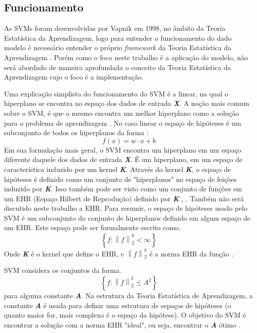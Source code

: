  \subsection{Funcionamento}

As SVMs foram desenvolvidas por Vapnik em 1998, no âmbito da Teoria Estatística da Aprendizagem, logo para entender o funcionamento do dado modelo é necessário entender o próprio \textit{framework} da Teoria Estatística da Aprendizagem \cite{vapnik1998statistical}. Porém como o foco neste trabalho é a aplicação do modelo, não será abordado de maneira aprofundada o conceito da Teoria Estatística da Aprendizagem cujo o foco é a implementação.
 
Uma explicação simplista do funcionamento do SVM é a linear, na qual o hiperplano se encontra no espaço dos dados de entrada \textbf{\textit{X}}. A noção mais comum sobre o SVM, é que o mesmo encontra um melhor hiperplano como a solução para o problema de aprendizagem \cite{vapnik1998statistical}. No caso linear o espaço de hipóteses é um subconjunto de todos os hiperplanos da forma \cite{evgeniou1999support}:\[f(x)= w\cdot x +b\]
Em sua formulação mais geral, o SVM encontra um hiperplano em um espaço diferente daquele dos dados de entrada \textbf{\textit{X}}. É um hiperplano, em um espaço de característica induzido por um kernel \textbf{\textit{K}}. Através do kernel \textbf{\textit{K}}, o espaço de hipóteses é definido como um conjunto de "hiperplanos" no espaço de feições induzido por \textbf{\textit{K}}. Isso também pode ser visto como um conjunto de funções em um EHR (Espaço Hilbert de Reprodução) definido por \textbf{\textit{K}} \cite{wahba1990spline}, \cite{vapnik1998statistical}. Também não será discutido neste trabalho a EHR. Para resumir, o espaço de hipóteses usado pelo SVM é um subconjunto do conjunto de hiperplanos definido em algum espaço de um EHR. Este espaço pode ser formalmente escrito como.\[\left \{ f:\left \| f \right \|_{2}^{k} < \infty \right \}\]
Onde \textbf{\textit{K}} é o kernel que define o EHR, e $ \left \| f \right \|_{2}^{k} $  é a norma EHR da função \cite{wahba1990spline}. 

SVM considera os conjuntos da forma. \[\left \{ f:\left \| f \right \|_{2}^{k} \leq A^{2} \right \}\] para alguma constante \textbf{\textit{A}}. Na estrutura da Teoria Estatística de Aprendizagem, a constante \textbf{\textit{A}} é usada para definir uma estrutura de espaços de hipóteses (o quanto maior for, mais complexo é o espaço da hipótese). O objetivo do SVM é encontrar a solução com a norma EHR "ideal", ou seja, encontrar o \textbf{\textit{A}} ótimo \cite{evgeniou1999support}.

